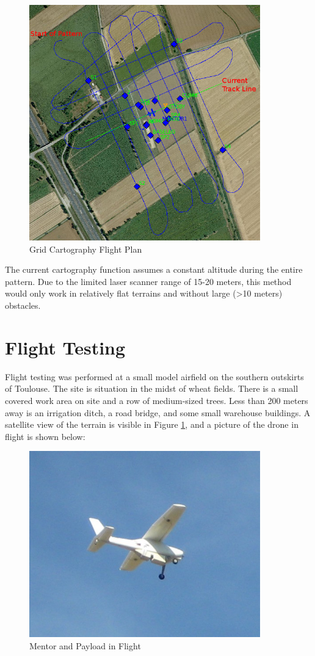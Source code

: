 \documentclass[a4paper,11pt]{report}
\begin{document}
\begin{figure}[ht]
 \centering
 \includegraphics[width=10cm]{pprz_cartography.png}
 \caption{Grid Cartography Flight Plan}
 \label{fig:gridcarto}
\end{figure}

The current cartography function assumes a constant altitude during the entire pattern. Due to the limited laser scanner range of 15-20 meters, this method would only work in relatively flat terrains and without large (>10 meters) obstacles.

\chapter{Flight Testing}
\label{flight_tests}

Flight testing was performed at a small model airfield on the southern outskirts of Toulouse. The site is situation in the midst of wheat fields. There is a small covered work area on site and a row of medium-sized trees. Less than 200 meters away is an irrigation ditch, a road bridge, and some small warehouse buildings. A satellite view of the terrain is visible in Figure \ref{fig:gridcarto}, and a picture of the drone in flight is shown below:

\begin{figure}[ht]
 \centering
 \includegraphics[width=10cm]{mentor_in_flight.JPG}
 \caption{Mentor and Payload in Flight}
 \label{fig:mentor_flying}
\end{figure}
\end{document}

